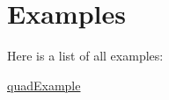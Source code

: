 \section{Examples}
Here is a list of all examples\+:\begin{DoxyCompactItemize}
\item 
\hyperlink{quadExample-example}{quad\+Example}
\end{DoxyCompactItemize}

